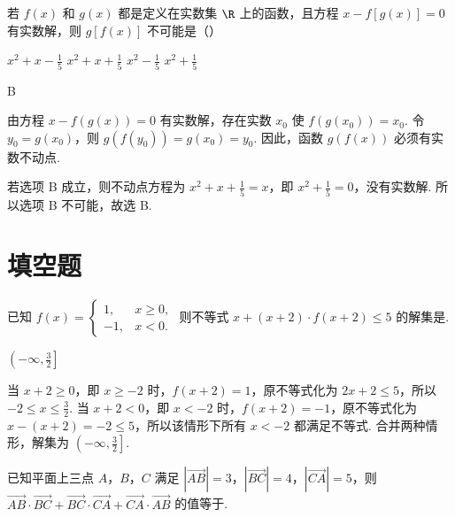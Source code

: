 \begin{problem}
若 \(f(x)\) 和 \(g(x)\) 都是定义在实数集 \(\R\) 上的函数，且方程 \(x - f[g(x)] = 0\) 有实数解，则 \(g[f(x)]\) 不可能是（\quad）

\choices
    {\(x^{2} + x - \frac{1}{5}\)}
    {\(x^{2} + x + \frac{1}{5}\)}
    {\(x^{2} - \frac{1}{5}\)}
    {\(x^{2} + \frac{1}{5}\)}
\end{problem}

\begin{answer}
B
\end{answer}

\begin{solution}
由方程 \(x-f(g(x))=0\) 有实数解，存在实数 \(x_0\) 使 \(f(g(x_0))=x_0\). 令 \(y_0=g(x_0)\)，则
\(g(f(y_0))=g(x_0)=y_0\). 因此，函数 \(g(f(x))\) 必须有实数不动点.

若选项 B 成立，则不动点方程为 \(x^2+x+\frac{1}{5}=x\)，即 \(x^2+\frac{1}{5}=0\)，没有实数解. 所以选项 B 不可能，故选 B.
\end{solution}

\section{填空题}
\begin{problem}
已知 \(f(x) = \begin{cases}
1, & x \geqslant 0,\\
-1, & x < 0.
\end{cases}\) 则不等式 \(x + (x + 2)\cdot f(x + 2) \leqslant 5\) 的解集是\fillinblank{}.
\end{problem}

\begin{answer}
\(\left(-\infty,\frac{3}{2}\right]\)
\end{answer}

\begin{solution}
当 \(x+2\geqslant0\)，即 \(x\geqslant-2\) 时，\(f(x+2)=1\)，原不等式化为 \(2x+2\leqslant5\)，所以 \(-2\leqslant x\leqslant\frac{3}{2}\). 当 \(x+2<0\)，即 \(x<-2\) 时，\(f(x+2)=-1\)，原不等式化为 \(x-(x+2)=-2\leqslant5\)，所以该情形下所有 \(x<-2\) 都满足不等式. 合并两种情形，解集为 \(\left(-\infty,\frac{3}{2}\right]\).
\end{solution}

\begin{problem}
已知平面上三点 \(A\)，\(B\)，\(C\) 满足 \(\left|\overrightarrow{AB}\right| = 3\)，\(\left|\overrightarrow{BC}\right| = 4\)，\(\left|\overrightarrow{CA}\right| = 5\)，则 \(\overrightarrow{AB}\cdot\overrightarrow{BC} + \overrightarrow{BC}\cdot\overrightarrow{CA} + \overrightarrow{CA}\cdot\overrightarrow{AB}\) 的值等于\fillinblank{}.
\end{problem}

